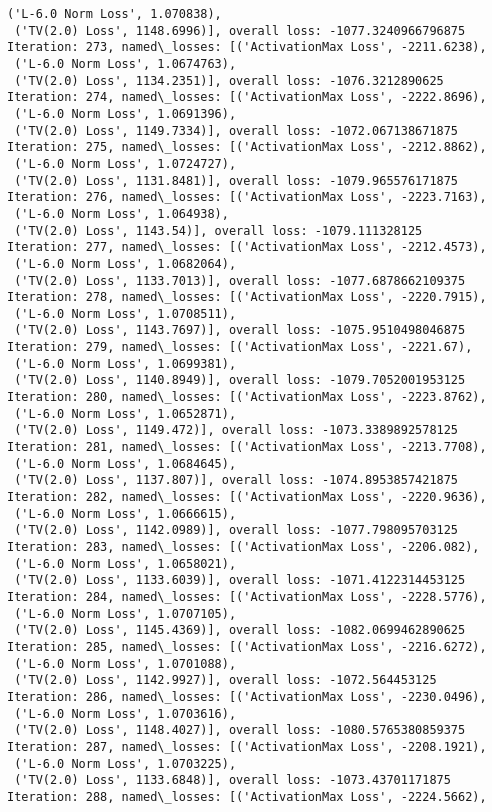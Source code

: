 \documentclass[10pt]{article}
\begin{document}
\begin{Verbatim}[commandchars=\\\{\}]
 ('L-6.0 Norm Loss', 1.070838),
 ('TV(2.0) Loss', 1148.6996)], overall loss: -1077.3240966796875
Iteration: 273, named\_losses: [('ActivationMax Loss', -2211.6238),
 ('L-6.0 Norm Loss', 1.0674763),
 ('TV(2.0) Loss', 1134.2351)], overall loss: -1076.3212890625
Iteration: 274, named\_losses: [('ActivationMax Loss', -2222.8696),
 ('L-6.0 Norm Loss', 1.0691396),
 ('TV(2.0) Loss', 1149.7334)], overall loss: -1072.067138671875
Iteration: 275, named\_losses: [('ActivationMax Loss', -2212.8862),
 ('L-6.0 Norm Loss', 1.0724727),
 ('TV(2.0) Loss', 1131.8481)], overall loss: -1079.965576171875
Iteration: 276, named\_losses: [('ActivationMax Loss', -2223.7163),
 ('L-6.0 Norm Loss', 1.064938),
 ('TV(2.0) Loss', 1143.54)], overall loss: -1079.111328125
Iteration: 277, named\_losses: [('ActivationMax Loss', -2212.4573),
 ('L-6.0 Norm Loss', 1.0682064),
 ('TV(2.0) Loss', 1133.7013)], overall loss: -1077.6878662109375
Iteration: 278, named\_losses: [('ActivationMax Loss', -2220.7915),
 ('L-6.0 Norm Loss', 1.0708511),
 ('TV(2.0) Loss', 1143.7697)], overall loss: -1075.9510498046875
Iteration: 279, named\_losses: [('ActivationMax Loss', -2221.67),
 ('L-6.0 Norm Loss', 1.0699381),
 ('TV(2.0) Loss', 1140.8949)], overall loss: -1079.7052001953125
Iteration: 280, named\_losses: [('ActivationMax Loss', -2223.8762),
 ('L-6.0 Norm Loss', 1.0652871),
 ('TV(2.0) Loss', 1149.472)], overall loss: -1073.3389892578125
Iteration: 281, named\_losses: [('ActivationMax Loss', -2213.7708),
 ('L-6.0 Norm Loss', 1.0684645),
 ('TV(2.0) Loss', 1137.807)], overall loss: -1074.8953857421875
Iteration: 282, named\_losses: [('ActivationMax Loss', -2220.9636),
 ('L-6.0 Norm Loss', 1.0666615),
 ('TV(2.0) Loss', 1142.0989)], overall loss: -1077.798095703125
Iteration: 283, named\_losses: [('ActivationMax Loss', -2206.082),
 ('L-6.0 Norm Loss', 1.0658021),
 ('TV(2.0) Loss', 1133.6039)], overall loss: -1071.4122314453125
Iteration: 284, named\_losses: [('ActivationMax Loss', -2228.5776),
 ('L-6.0 Norm Loss', 1.0707105),
 ('TV(2.0) Loss', 1145.4369)], overall loss: -1082.0699462890625
Iteration: 285, named\_losses: [('ActivationMax Loss', -2216.6272),
 ('L-6.0 Norm Loss', 1.0701088),
 ('TV(2.0) Loss', 1142.9927)], overall loss: -1072.564453125
Iteration: 286, named\_losses: [('ActivationMax Loss', -2230.0496),
 ('L-6.0 Norm Loss', 1.0703616),
 ('TV(2.0) Loss', 1148.4027)], overall loss: -1080.5765380859375
Iteration: 287, named\_losses: [('ActivationMax Loss', -2208.1921),
 ('L-6.0 Norm Loss', 1.0703225),
 ('TV(2.0) Loss', 1133.6848)], overall loss: -1073.43701171875
Iteration: 288, named\_losses: [('ActivationMax Loss', -2224.5662),

\end{Verbatim}
\end{document}
